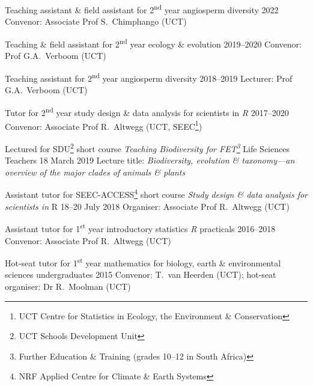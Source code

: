 \documentclass[10pt]{article}
\begin{document}

\begin{hangparas}{2em}{1}

Teaching assistant \& field assistant for 2\textsuperscript{nd} year angiosperm
diversity                                                     \hfill 2022 \break
Convenor: Associate Prof S.~Chimphango (UCT)

Teaching \& field assistant for 2\textsuperscript{nd} year ecology \& evolution
                                                        \hfill 2019--2020 \break
Convenor: Prof G.A.~Verboom (UCT)

Teaching assistant for 2\textsuperscript{nd} year angiosperm diversity
                                                        \hfill 2018--2019 \break
Lecturer: Prof G.A.~Verboom (UCT)

Tutor for 2\textsuperscript{nd} year study design \& data analysis for 
scientists in \textit{R}                                \hfill 2017--2020 \break
Convenor: Associate Prof R.~Altwegg (UCT, SEEC\footnote{UCT Centre for 
Statistics in Ecology, the Environment \& Conservation})

Lectured for SDU\footnote{UCT Schools Development Unit} short course 
\textit{Teaching Biodiversity for FET\footnote{Further Education \& Training
(grades 10--12 in South Africa)}} Life Sciences Teachers
                                                     \hfill 18 March 2019 \break
Lecture title: \textit{Biodiversity, evolution \& taxonomy---an overview of the 
major clades of animals \& plants}

Assistant tutor for SEEC-ACCESS\footnote{NRF Applied Centre for Climate \&
Earth Systems} short course \textit{Study design \& data analysis for 
scientists in} R                               \hfill 18--20 July 2018 \break
Organiser: Associate Prof R.~Altwegg (UCT)

Assistant tutor for 1\textsuperscript{st} year introductory statistics
\textit{R} practicals                                   \hfill 2016--2018 \break
Convenor: Associate Prof R.~Altwegg (UCT)

Hot-seat tutor for 1\textsuperscript{st} year mathematics for biology, earth \& 
environmental sciences undergraduates                         \hfill 2015 \break
Convenor: T.~van Heerden (UCT); hot-seat organiser: Dr R.~Moolman (UCT)

\hfill

\end{hangparas}
\end{document}
